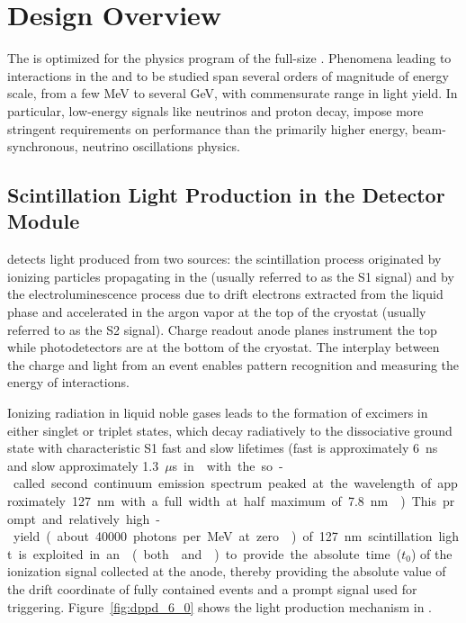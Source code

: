 \section{Design Overview}
\label{sec:dp-pds-overview}

The \dual {} is optimized for the physics program of the full-size \dune {}. Phenomena leading to interactions in the   and to be studied span several orders of magnitude of energy scale, from a few \si{MeV} to several \si{GeV}, with commensurate range in light yield. In particular, low-energy signals like  neutrinos and proton decay, impose more stringent requirements on  performance than the primarily higher energy, beam-synchronous, neutrino oscillations physics.



\subsection{Scintillation Light Production in the \dual Detector Module}
\label{sec:dp-pds-overview_scintillation}

\dual {} detects light produced from two sources: the scintillation process originated by ionizing particles propagating in the  (usually referred to as the S1 signal) and by the electroluminescence process due to drift electrons extracted from the liquid phase and accelerated in the argon vapor at the top of the cryostat (usually referred to as the S2 signal). Charge readout anode planes instrument the top while photodetectors are at the bottom of the cryostat. The interplay between the charge and light from an event enables pattern recognition and measuring the energy of interactions.

Ionizing radiation in liquid noble gases leads 
 to the formation of excimers in either singlet or triplet states, which decay radiatively to the dissociative ground state with characteristic S1 fast and slow lifetimes (fast is approximately \SI{6}{ns} and slow approximately \SI{1.3}{$\mu$s} in \lar with the so-called second continuum emission spectrum peaked at the wavelength of approximately \SI{127}{nm}
  with a full width at half maximum of \SI{7.8}{nm} \cite{Heindl}). This prompt and relatively high-yield (about \num{40000} photons per \si{MeV} at zero \efield) of \SI{127}{nm} scintillation light is exploited in an  (both  and ) to provide the absolute time ($t_0$) of the ionization signal collected at the anode, thereby providing the absolute value of the drift coordinate of fully contained events and a prompt signal used for triggering. Figure~\ref{fig:dppd_6_0} shows the light production mechanism in \lar.


